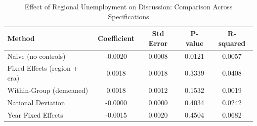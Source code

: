 \begin{table}
\caption{Effect of Regional Unemployment on Discussion: Comparison Across Specifications}
\label{tab:specifications}
\begin{tabular}{lcccc}
\toprule
Method & Coefficient & Std Error & P-value & R-squared \\
\midrule
Naive (no controls) & -0.0020 & 0.0008 & 0.0121 & 0.0057 \\
Fixed Effects (region + era) & 0.0018 & 0.0018 & 0.3339 & 0.0408 \\
Within-Group (demeaned) & 0.0018 & 0.0012 & 0.1532 & 0.0019 \\
National Deviation & -0.0000 & 0.0000 & 0.4034 & 0.0242 \\
Year Fixed Effects & -0.0015 & 0.0020 & 0.4504 & 0.0682 \\
\bottomrule
\end{tabular}
\end{table}
